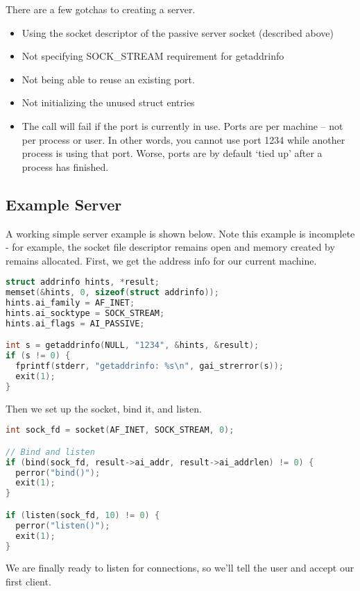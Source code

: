 There are a few gotchas to creating a server.

\begin{itemize}
\item
  Using the socket descriptor of the passive server socket (described above)
\item
  Not specifying SOCK\_STREAM requirement for getaddrinfo
\item
  Not being able to reuse an existing port.
\item
  Not initializing the unused struct entries
\item
  The  call will fail if the port is currently in use. Ports are per machine -- not per process or user.
  In other words, you cannot use port 1234 while another process is using that port.
  Worse, ports are by default `tied up' after a process has finished.
\end{itemize}

\subsection{Example Server}

A working simple server example is shown below.
Note this example is incomplete - for example, the socket file descriptor remains open and memory created by  remains allocated.
First, we get the address info for our current machine.

\begin{lstlisting}[language=C]
struct addrinfo hints, *result;
memset(&hints, 0, sizeof(struct addrinfo));
hints.ai_family = AF_INET;
hints.ai_socktype = SOCK_STREAM;
hints.ai_flags = AI_PASSIVE;

int s = getaddrinfo(NULL, "1234", &hints, &result);
if (s != 0) {
  fprintf(stderr, "getaddrinfo: %s\n", gai_strerror(s));
  exit(1);
}
\end{lstlisting}

Then we set up the socket, bind it, and listen.

\begin{lstlisting}[language=C]
int sock_fd = socket(AF_INET, SOCK_STREAM, 0);

// Bind and listen
if (bind(sock_fd, result->ai_addr, result->ai_addrlen) != 0) {
  perror("bind()");
  exit(1);
}

if (listen(sock_fd, 10) != 0) {
  perror("listen()");
  exit(1);
}
\end{lstlisting}

We are finally ready to listen for connections, so we'll tell the user and accept our first client.

